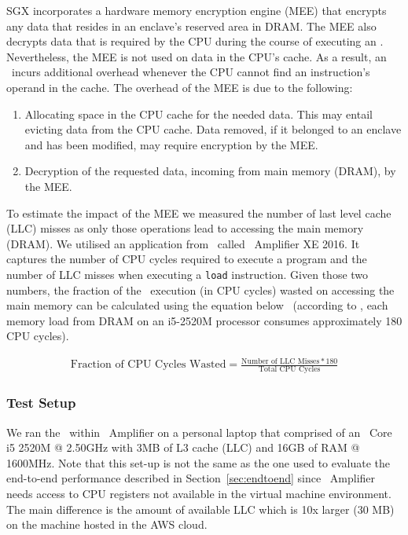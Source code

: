 \documentclass[../../../main.tex]{subfiles}
\begin{document}
\label{sec:mem-analysis}
SGX incorporates a hardware memory encryption engine (MEE) that
encrypts any data that resides in an enclave's reserved area in DRAM.
The MEE also decrypts data that is required by the CPU during the
course of executing an \enclaveprogram. Nevertheless, the MEE is not
used on data in the CPU's cache. As a result, an
\enclaveprogram~incurs additional overhead whenever the CPU cannot
find an instruction's operand in the cache. The overhead of the MEE is
due to the following:
\begin{enumerate}
  \item Allocating space in the CPU cache for the needed data. This
    may entail evicting data from the CPU cache. Data removed, if it
    belonged to an enclave and has been modified, may require encryption
    by the MEE.
  \item Decryption of the requested data, incoming from main memory
    (DRAM), by the MEE.
\end{enumerate}

To estimate the impact of the MEE we measured the number of last level
cache (LLC) misses as only those operations lead to accessing the main
memory (DRAM). We utilised an application from \Intel~called
\VTune~Amplifier XE 2016. It captures the number of CPU cycles
required to execute a program and the number of LLC misses when
executing a \texttt{load} instruction. Given those two numbers, the
fraction of the \enclaveprogram~execution (in CPU cycles) wasted on
accessing the main memory can be calculated using the equation
below~\cite{intel-eqn} (according to \Intel, each memory load from DRAM
on an i5-2520M processor consumes approximately 180 CPU cycles).

\begin{align*}
  \text{Fraction of CPU Cycles Wasted} = 
  \frac{\text{Number of LLC Misses} * 180}
  {\text{Total CPU Cycles}}
\end{align*}


\subsubsection*{Test Setup}
We ran the \enclavemodel~within \VTune~Amplifier on a personal laptop
that comprised of an \Intel~Core i5 2520M @ 2.50GHz with 3MB of L3
cache (LLC) and 16GB of RAM @ 1600MHz. Note that this set-up is not
the same as the one used to evaluate the end-to-end performance
described in Section~\ref{sec:endtoend} since \VTune~Amplifier needs
access to CPU registers not available in the virtual machine
environment. The main difference is the amount of available LLC which
is 10x larger (30 MB) on the machine hosted in the AWS cloud.
\end{document}
